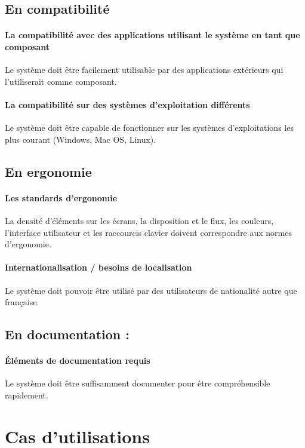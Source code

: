 \documentclass[12pt,a4paper,openany]{report}
\begin{document}
		\subsection{En compatibilité}
		\paragraph{La compatibilité avec des applications utilisant le système en tant que composant} Le système doit être facilement
		utilisable par des applications extérieurs qui l'utiliserait comme composant.
		\paragraph{La compatibilité sur des systèmes d'exploitation différents} Le système doit être capable de fonctionner sur les 
		systèmes d'exploitations les plus courant (Windows, Mac OS, Linux).
		\subsection{En ergonomie}
		\paragraph{Les standards d'ergonomie} La densité d'éléments sur les écrans, la disposition et le flux, les couleurs, l'interface 
		utilisateur et les raccourcis clavier doivent correspondre aux normes d'ergonomie.
		\paragraph{Internationalisation / besoins de localisation} Le système doit pouvoir être utilisé par des utilisateurs de nationalité autre que française.
		\subsection{En documentation :}
		\paragraph{Éléments de documentation requis} Le système doit être suffisamment documenter pour être compréhensible rapidement.
	\section{Cas d'utilisations}
\end{document}
